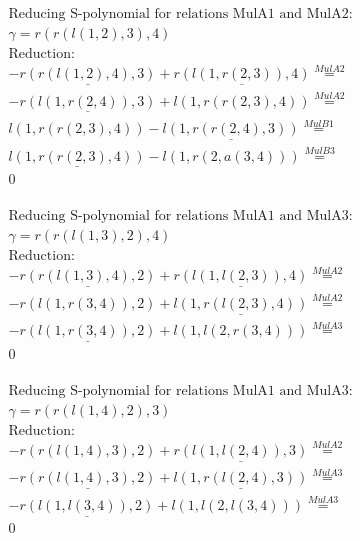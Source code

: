 \documentclass[11pt]{amsart}
\begin{document}
\begin{align*} 
& \text{Reducing S-polynomial for relations MulA1 and MulA2:} \\ 
& \gamma = r(r(l(1,2),3),4) \\ 
& \text{Reduction}: \\& - \underline{r(r(l(1,2),4),3)} + \underline{r(l(1,r(2,3)),4)} \stackrel{ MulA2 }{=}  \\ 
& - \underline{r(l(1,r(2,4)),3)} + l(1,r(r(2,3),4)) \stackrel{ MulA2 }{=}  \\ 
&l(1,r(r(2,3),4)) - \underline{l(1,r(r(2,4),3))} \stackrel{ MulB1 }{=}  \\ 
&\underline{l(1,r(r(2,3),4))} - l(1,r(2,a(3,4))) \stackrel{ MulB3 }{=}  \\ 
&0\\ 
\end{align*} 
 
\begin{align*} 
& \text{Reducing S-polynomial for relations MulA1 and MulA3:} \\ 
& \gamma = r(r(l(1,3),2),4) \\ 
& \text{Reduction}: \\& - \underline{r(r(l(1,3),4),2)} + \underline{r(l(1,l(2,3)),4)} \stackrel{ MulA2 }{=}  \\ 
& - r(l(1,r(3,4)),2) + \underline{l(1,r(l(2,3),4))} \stackrel{ MulA2 }{=}  \\ 
& - \underline{r(l(1,r(3,4)),2)} + l(1,l(2,r(3,4))) \stackrel{ MulA3 }{=}  \\ 
&0\\ 
\end{align*} 
 
\begin{align*} 
& \text{Reducing S-polynomial for relations MulA1 and MulA3:} \\ 
& \gamma = r(r(l(1,4),2),3) \\ 
& \text{Reduction}: \\& - r(r(l(1,4),3),2) + \underline{r(l(1,l(2,4)),3)} \stackrel{ MulA2 }{=}  \\ 
& - \underline{r(r(l(1,4),3),2)} + \underline{l(1,r(l(2,4),3))} \stackrel{ MulA3 }{=}  \\ 
& - \underline{r(l(1,l(3,4)),2)} + l(1,l(2,l(3,4))) \stackrel{ MulA3 }{=}  \\ 
&0\\ 
\end{align*} 
 
\end{document}
